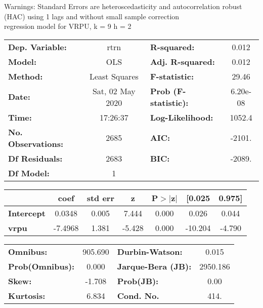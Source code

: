 Warnings: \newline
 [1] Standard Errors are heteroscedasticity and autocorrelation robust (HAC) using 1 lags and without small sample correction\\ 

regression model for VRPU, k = 9 h = 2\begin{center}
\begin{tabular}{lclc}
\toprule
\textbf{Dep. Variable:}    &       rtrn       & \textbf{  R-squared:         } &     0.012   \\
\textbf{Model:}            &       OLS        & \textbf{  Adj. R-squared:    } &     0.012   \\
\textbf{Method:}           &  Least Squares   & \textbf{  F-statistic:       } &     29.46   \\
\textbf{Date:}             & Sat, 02 May 2020 & \textbf{  Prob (F-statistic):} &  6.20e-08   \\
\textbf{Time:}             &     17:26:37     & \textbf{  Log-Likelihood:    } &    1052.4   \\
\textbf{No. Observations:} &        2685      & \textbf{  AIC:               } &    -2101.   \\
\textbf{Df Residuals:}     &        2683      & \textbf{  BIC:               } &    -2089.   \\
\textbf{Df Model:}         &           1      & \textbf{                     } &             \\
\bottomrule
\end{tabular}
\begin{tabular}{lcccccc}
                   & \textbf{coef} & \textbf{std err} & \textbf{z} & \textbf{P$> |$z$|$} & \textbf{[0.025} & \textbf{0.975]}  \\
\midrule
\textbf{Intercept} &       0.0348  &        0.005     &     7.444  &         0.000        &        0.026    &        0.044     \\
\textbf{vrpu}      &      -7.4968  &        1.381     &    -5.428  &         0.000        &      -10.204    &       -4.790     \\
\bottomrule
\end{tabular}
\begin{tabular}{lclc}
\textbf{Omnibus:}       & 905.690 & \textbf{  Durbin-Watson:     } &    0.015  \\
\textbf{Prob(Omnibus):} &   0.000 & \textbf{  Jarque-Bera (JB):  } & 2950.186  \\
\textbf{Skew:}          &  -1.708 & \textbf{  Prob(JB):          } &     0.00  \\
\textbf{Kurtosis:}      &   6.834 & \textbf{  Cond. No.          } &     414.  \\
\bottomrule
\end{tabular}
\end{center}


